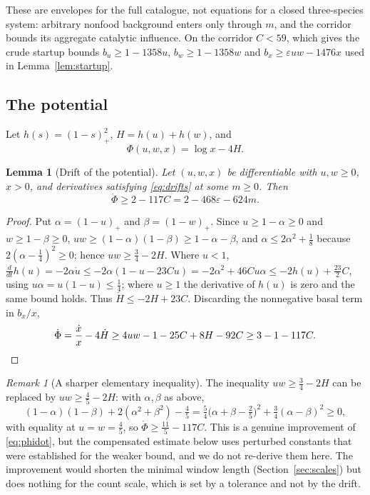 \documentclass[11pt,letterpaper]{article}
\theoremstyle{plain}
\newtheorem{lemma}[theorem]{Lemma}
\theoremstyle{definition}
\theoremstyle{remark}
\newtheorem{remark}[theorem]{Remark}
\numberwithin{equation}{section}
\newcommand{\eps}{\varepsilon}
\begin{document}
These are envelopes for the full catalogue, not equations for a closed three-species system: arbitrary nonfood background enters only through $m$, and the corridor bounds its aggregate catalytic influence. On the corridor $C<59$, which gives the crude startup bounds $b_u\ge1-1358u$, $b_w\ge1-1358w$ and $b_x\ge\eps uw-1476x$ used in Lemma~\ref{lem:startup}.

\subsection{The potential}\label{sec:potential}
Let $h(s)=(1-s)_+^2$, $H=h(u)+h(w)$, and
\begin{equation}\label{eq:potential}
 \Phi(u,w,x)=\log x-4H .
\end{equation}

\begin{lemma}[Drift of the potential]\label{lem:potential}
Let $(u,w,x)$ be differentiable with $u,w\ge0$, $x>0$, and derivatives satisfying \eqref{eq:drifts} at some $m\ge0$. Then
\begin{equation}\label{eq:phidot}
 \dot\Phi\ge2-117C=2-468\eps-624m .
\end{equation}
\end{lemma}
\begin{proof}
Put $\alpha=(1-u)_+$ and $\beta=(1-w)_+$. Since $u\ge1-\alpha\ge0$ and $w\ge1-\beta\ge0$, $uw\ge(1-\alpha)(1-\beta)\ge1-\alpha-\beta$, and $\alpha\le2\alpha^2+\tfrac18$ because $2(\alpha-\tfrac14)^2\ge0$; hence $uw\ge\tfrac34-2H$. Where $u<1$, $\frac d{dt}h(u)=-2\alpha\dot u\le-2\alpha(1-u-23Cu)=-2\alpha^2+46Cu\alpha\le-2h(u)+\tfrac{23}2C$, using $u\alpha=u(1-u)\le\tfrac14$; where $u\ge1$ the derivative of $h(u)$ is zero and the same bound holds. Thus $\dot H\le-2H+23C$. Discarding the nonnegative basal term in $b_x/x$,
\[
 \dot\Phi=\frac{\dot x}x-4\dot H\ge4uw-1-25C+8H-92C\ge3-1-117C .\qedhere
\]
\end{proof}

\begin{remark}[A sharper elementary inequality]\label{rem:fourfifths}
The inequality $uw\ge\tfrac34-2H$ can be replaced by $uw\ge\tfrac45-2H$: with $\alpha,\beta$ as above,
\[
 (1-\alpha)(1-\beta)+2(\alpha^2+\beta^2)-\tfrac45=\tfrac54\bigl(\alpha+\beta-\tfrac25\bigr)^2+\tfrac34(\alpha-\beta)^2\ge0,
\]
with equality at $u=w=\tfrac45$, so $\dot\Phi\ge\tfrac{11}5-117C$. This is a genuine improvement of \eqref{eq:phidot}, but the compensated estimate below uses perturbed constants that were established for the weaker bound, and we do not re-derive them here. The improvement would shorten the minimal window length (Section~\ref{sec:scales}) but does nothing for the count scale, which is set by a tolerance and not by the drift.
\end{remark}
\end{document}
